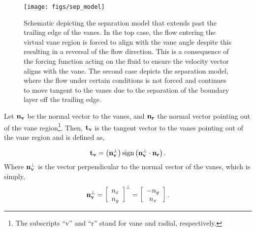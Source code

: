 \begin{figure}[!htb]
  \begin{center}
    \texttt{[image: figs/sep\_model]}
    \caption{Schematic depicting the separation model that extends past
   the trailing edge of the vanes. In the top case, the flow entering
   the virtual vane region is forced to align with the vane angle despite
   this resulting in a reversal of the flow direction. This is a
   consequence of the forcing function acting on the fluid to ensure the
   velocity vector aligns with the vane. 
   The second case depicts the separation
   model, where the flow under certain conditions is not forced and
   continues to move tangent to the vanes due to 
   the separation of the boundary layer off the trailing edge.} 
    \label{fig:sep_model}
  \end{center}
\end{figure}

Let $\bf n_v$ be the normal vector to the vanes,
and $\bf n_r$ the normal vector pointing out of the vane
region\footnote{\normalsize The subscripts ``v'' and ``r'' stand for
vane and radial, respectively.}.  
Then, $\bf t_v$ is the tangent vector to the vanes pointing out of
the vane region and is defined as,

\begin{equation}
 \bf t_v = \left( {\bf n_v^{\perp}} \right) \text{sign}\left(
	    {\bf n_v^{\perp}} \cdot {\bf n_r} \right).
\end{equation}
Where ${\bf n_v^{\perp}}$ is the vector perpendicular to the normal
vector of the vanes, which is simply, 
\begin{equation*}
 {\bf n_v^{\perp}} = \left[ \begin{array}{c}
n_x\\
n_y\\
\end{array}\right]^{\perp} = 
 \left[ \begin{array}{c}
  -n_y\\
  n_x\\
	\end{array}\right].
\end{equation*}

%
%

